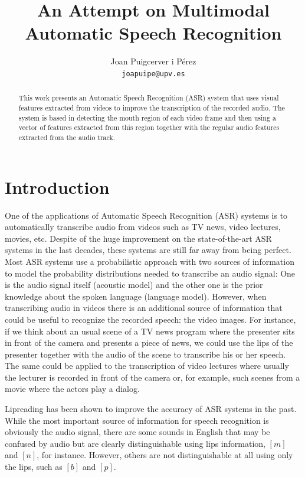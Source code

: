 \documentclass[12pt,a4paper]{article}
\author{Joan Puigcerver i Pérez\\
\footnotesize{\texttt{joapuipe@upv.es}}}
\title{An Attempt on Multimodal Automatic Speech Recognition}
\begin{document}
\maketitle
\begin{abstract}
This work presents an Automatic Speech Recognition (ASR) system that uses visual features extracted from videos to improve the transcription of the recorded audio. The system is based in detecting the mouth region of each video frame and then using a vector of features extracted from this region together with the regular audio features extracted from the audio track.
\end{abstract}

\section{Introduction}
One of the applications of Automatic Speech Recognition (ASR) systems is to automatically transcribe audio from videos such as TV news, video lectures, movies, etc. Despite of the huge improvement on the state-of-the-art ASR systems in the last decades, these systems are still far away from being perfect. Most ASR systems use a probabilistic approach with two sources of information to model the probability distributions needed to transcribe an audio signal: One is the audio signal itself (acoustic model) and the other one is the prior knowledge about the spoken language (language model). However, when transcribing audio in videos there is an additional source of information that could be useful to recognize the recorded speech: the video images. For instance, if we think about an usual scene of a TV news program where the presenter sits in front of the camera and presents a piece of news, we could use the lips of the presenter together with the audio of the scene to transcribe his or her speech. The same could be applied to the transcription of video lectures where usually the lecturer is recorded in front of the camera or, for example, such scenes from a movie where the actors play a dialog.

Lipreading has been shown to improve the accuracy of ASR systems in the past\cite{neti2000audio, dupont2000audio, hazen2004segment}. While the most important source of information for speech recognition is obviously the audio signal, there are some sounds in English that may be confused by audio but are clearly distinguishable using lips information, $[m]$ and $[n]$, for instance. However, others are not distinguishable at all using only the lips, such as $[b]$ and $[p]$.
\end{document}
